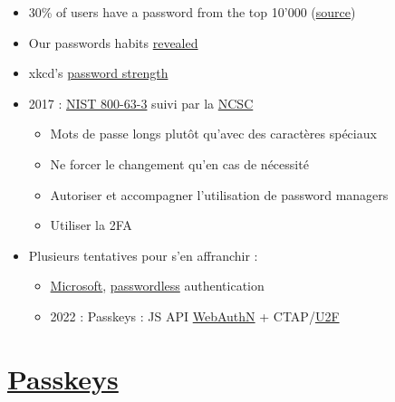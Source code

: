 \begin{itemize}
\tightlist
\item
  30\% of users have a password from the top 10'000
  (\href{https://xato.net/10-000-top-passwords-6d6380716fe0\#.q5gcg2vme}{source})
\item
  Our passwords habits
  \href{http://visual.ly/our-password-habits-revealed}{revealed}
\item
  xkcd's \href{http://xkcd.com/936/}{password strength}
\item
  2017 :
  \href{https://nakedsecurity.sophos.com/2016/08/18/nists-new-password-rules-what-you-need-to-know/}{NIST
  800-63-3} suivi par la
  \href{https://www.ncsc.gov.uk/guidance/password-guidance-simplifying-your-approach}{NCSC}

  \begin{itemize}
  \tightlist
  \item
    Mots de passe longs plutôt qu'avec des caractères spéciaux
  \item
    Ne forcer le changement qu'en cas de nécessité
  \item
    Autoriser et accompagner l'utilisation de password managers
  \item
    Utiliser la 2FA
  \end{itemize}
\item
  Plusieurs tentatives pour s'en affranchir :

  \begin{itemize}
  \tightlist
  \item
    \href{https://www.microsoft.com/security/blog/2021/09/15/the-passwordless-future-is-here-for-your-microsoft-account/}{Microsoft},
    \href{https://hacks.mozilla.org/2014/10/passwordless-authentication-secure-simple-and-fast-to-deploy/}{passwordless}
    authentication
  \item
    2022 : Passkeys : JS API
    \href{https://en.wikipedia.org/wiki/WebAuthn}{WebAuthN} +
    CTAP/\href{https://u2f-key.tech/fr/}{U2F}
  \end{itemize}
\end{itemize}

\hypertarget{passkeys35}{%
\section{\texorpdfstring{\href{https://medium.com/webauthnworks/introduction-to-webauthn-api-5fd1fb46c285}{Passkeys}}{Passkeys}}\label{passkeys35}}

